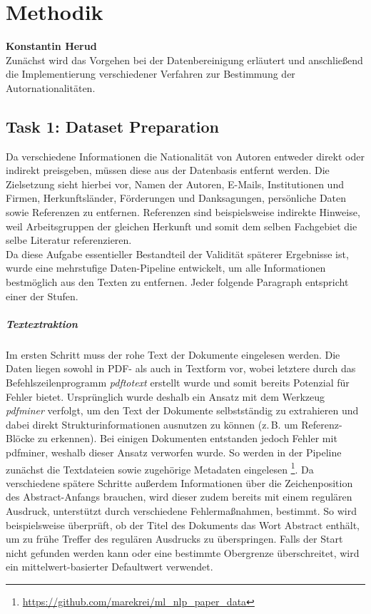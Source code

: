 \documentclass[bachelor,german]{info1thesis}
\begin{document}

\chapter{Methodik}
\textbf{Konstantin Herud} \\
Zunächst wird das Vorgehen bei der Datenbereinigung erläutert und anschließend die Implementierung verschiedener Verfahren zur Bestimmung der Autornationalitäten.

\section{Task 1: Dataset Preparation}

Da verschiedene Informationen die Nationalität von Autoren entweder direkt oder indirekt preisgeben, müssen diese aus der Datenbasis entfernt werden. Die Zielsetzung sieht hierbei vor,
Namen der Autoren,
E-Mails,
Institutionen und Firmen,
Herkunftsländer,
Förderungen und Danksagungen,
persönliche Daten
sowie Referenzen
zu entfernen.
Referenzen sind beispielsweise indirekte Hinweise, weil Arbeitsgruppen der gleichen Herkunft und somit dem selben Fachgebiet die selbe Literatur referenzieren. \\
Da diese Aufgabe essentieller Bestandteil der Validität späterer Ergebnisse ist, wurde eine mehrstufige Daten-Pipeline entwickelt, um alle Informationen bestmöglich aus den Texten zu entfernen. Jeder folgende Paragraph entspricht einer der Stufen.

\paragraph{Textextraktion} Im ersten Schritt muss der rohe Text der Dokumente eingelesen werden. Die Daten liegen sowohl in PDF- als auch in Textform vor, wobei letztere durch das Befehlszeilenprogramm \textit{pdftotext} erstellt wurde und somit bereits Potenzial für Fehler bietet. Ursprünglich wurde deshalb ein Ansatz mit dem Werkzeug \textit{pdfminer} verfolgt, um den Text der Dokumente selbstständig zu extrahieren und dabei direkt Strukturinformationen ausnutzen zu können (z.\,B. um Referenz-Blöcke zu erkennen). Bei einigen Dokumenten entstanden jedoch Fehler mit pdfminer, weshalb dieser Ansatz verworfen wurde. So werden in der Pipeline zunächst die Textdateien sowie zugehörige Metadaten eingelesen \footnote{\url{https://github.com/marekrei/ml_nlp_paper_data}}. Da verschiedene spätere Schritte außerdem Informationen über die Zeichenposition des Abstract-Anfangs brauchen, wird dieser zudem bereits mit einem regulären Ausdruck, unterstützt durch verschiedene Fehlermaßnahmen, bestimmt. So wird beispielsweise überprüft, ob der Titel des Dokuments das Wort Abstract enthält, um zu frühe Treffer des regulären Ausdrucks zu überspringen. Falls der Start nicht gefunden werden kann oder eine bestimmte Obergrenze überschreitet, wird ein mittelwert-basierter Defaultwert verwendet.
\end{document}
